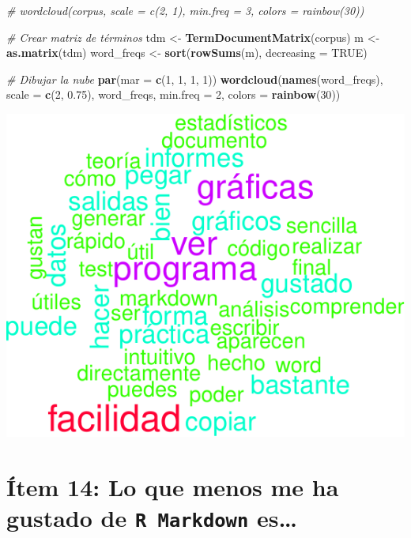 \documentclass[
]{article}
\newenvironment{Shaded}{\begin{snugshade}}{\end{snugshade}}
\newcommand{\AttributeTok}[1]{\textcolor[rgb]{0.13,0.29,0.53}{#1}}
\newcommand{\CommentTok}[1]{\textcolor[rgb]{0.56,0.35,0.01}{\textit{#1}}}
\newcommand{\ConstantTok}[1]{\textcolor[rgb]{0.56,0.35,0.01}{#1}}
\newcommand{\DecValTok}[1]{\textcolor[rgb]{0.00,0.00,0.81}{#1}}
\newcommand{\FloatTok}[1]{\textcolor[rgb]{0.00,0.00,0.81}{#1}}
\newcommand{\FunctionTok}[1]{\textcolor[rgb]{0.13,0.29,0.53}{\textbf{#1}}}
\newcommand{\NormalTok}[1]{#1}
\newcommand{\OtherTok}[1]{\textcolor[rgb]{0.56,0.35,0.01}{#1}}
\begin{document}
\begin{Shaded}
\begin{Highlighting}[]
\CommentTok{\# wordcloud(corpus, scale = c(2, 1), min.freq = 3, colors = rainbow(30))}

\CommentTok{\# Crear matriz de términos}
\NormalTok{tdm }\OtherTok{\textless{}{-}} \FunctionTok{TermDocumentMatrix}\NormalTok{(corpus)}
\NormalTok{m }\OtherTok{\textless{}{-}} \FunctionTok{as.matrix}\NormalTok{(tdm)}
\NormalTok{word\_freqs }\OtherTok{\textless{}{-}} \FunctionTok{sort}\NormalTok{(}\FunctionTok{rowSums}\NormalTok{(m), }\AttributeTok{decreasing =} \ConstantTok{TRUE}\NormalTok{)}

\CommentTok{\# Dibujar la nube}
\FunctionTok{par}\NormalTok{(}\AttributeTok{mar =} \FunctionTok{c}\NormalTok{(}\DecValTok{1}\NormalTok{, }\DecValTok{1}\NormalTok{, }\DecValTok{1}\NormalTok{, }\DecValTok{1}\NormalTok{))}
\FunctionTok{wordcloud}\NormalTok{(}\FunctionTok{names}\NormalTok{(word\_freqs), }\AttributeTok{scale =} \FunctionTok{c}\NormalTok{(}\DecValTok{2}\NormalTok{, }\FloatTok{0.75}\NormalTok{), word\_freqs, }\AttributeTok{min.freq =} \DecValTok{2}\NormalTok{, }
          \AttributeTok{colors =} \FunctionTok{rainbow}\NormalTok{(}\DecValTok{30}\NormalTok{))}
\end{Highlighting}
\end{Shaded}

\includegraphics{informe_files/figure-latex/unnamed-chunk-14-1.pdf}

\hypertarget{uxedtem-14-lo-que-menos-me-ha-gustado-de-es}{%
\section{\texorpdfstring{Ítem 14: Lo que menos me ha gustado de
\texttt{R Markdown}
es\ldots{}}{Ítem 14: Lo que menos me ha gustado de  es\ldots{}}}\label{uxedtem-14-lo-que-menos-me-ha-gustado-de-es}}
\end{document}
